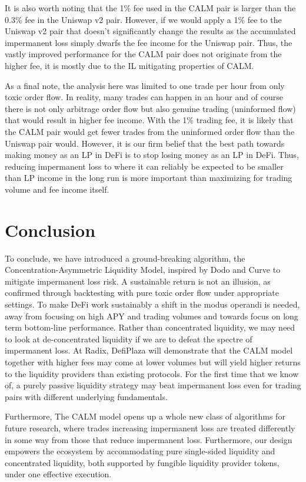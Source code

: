 \documentclass [10pt, twoside] {article}
\newcounter {note}
\begin{document}
It is also worth noting that the 1\% fee used in the CALM pair is larger than the 0.3\% fee in the Uniswap v2 pair. However, if we would apply a 1\% fee to the Uniswap v2 pair that doesn't significantly change the results as the accumulated impermanent loss simply dwarfs the fee income for the Uniswap pair. Thus, the vastly improved performance for the CALM pair does not originate from the higher fee, it is mostly due to the IL mitigating properties of CALM.

As a final note, the analysis here was limited to one trade per hour from only toxic order flow. In reality, many trades can happen in an hour and of course there is not only arbitrage order flow but also genuine trading (uninformed flow) that would result in higher fee income. With the 1\% trading fee, it is likely that the CALM pair would get fewer trades from the uninformed order flow than the Uniswap pair would. However, it is our firm belief that the best path towards making money as an LP in DeFi is to stop losing money as an LP in DeFi. Thus, reducing impermanent loss to where it can reliably be expected to be smaller than LP income in the long run is more important than maximizing for trading volume and fee income itself.

\section{Conclusion}
To conclude, we have introduced a ground-breaking algorithm, the Concentration-Asymmetric Liquidity Model, inspired by Dodo and Curve to mitigate impermanent loss risk. A sustainable return is not an illusion, as confirmed through backtesting with pure toxic order flow under appropriate settings. To make DeFi work sustainably a shift in the modus operandi is needed, away from focusing on high APY and trading volumes and towards focus on long term bottom-line performance. Rather than concentrated liquidity, we may need to look at de-concentrated liquidity if we are to defeat the spectre of impermanent loss. At Radix, DefiPlaza will demonstrate that the CALM model together with higher fees may come at lower volumes but will yield higher returns to the liquidity providers than existing protocols. For the first time that we know of, a purely passive liquidity strategy may beat impermanent loss even for trading pairs with different underlying fundamentals.

Furthermore, The CALM model opens up a whole new class of algorithms for future research, where trades increasing impermanent loss are treated differently in some way from those that reduce impermanent loss. Furthermore, our design empowers the ecosystem by accommodating pure single-sided liquidity and concentrated liquidity, both supported by fungible liquidity provider tokens, under one effective execution.
\end{document}
